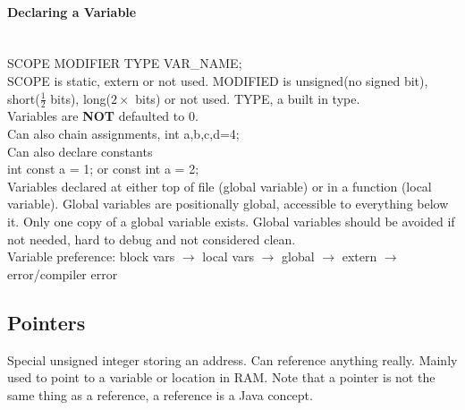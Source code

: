 \documentclass[12 pt]{article}
\begin{document}
\paragraph{Declaring a Variable}
~\\ SCOPE MODIFIER TYPE VAR\_NAME;
\\ SCOPE is static, extern or not used. MODIFIED is unsigned(no signed bit), short($\frac{1}{2}$ bits), long($2\times $ bits) or not used. TYPE, a built in type.
\\ Variables are \textbf{NOT} defaulted to 0.
\\ Can also chain assignments, int a,b,c,d=4;
\\ Can also declare constants
\\ int const a = 1; or const int a = 2;
\\ Variables declared at either top of file (global variable) or in a function (local variable). Global variables are positionally global, accessible to everything below it. Only one copy of a global variable exists. Global variables should be avoided if not needed, hard to debug and not considered clean.
\\ Variable preference: block vars $\to$ local vars $\to$ global $\to$ extern $\to$ error/compiler error
\subsection{Pointers} Special unsigned integer storing an address. Can reference anything really. Mainly used to point to a variable or location in RAM. Note that a pointer is not the same thing as a reference, a reference is a Java concept.
\end{document}
